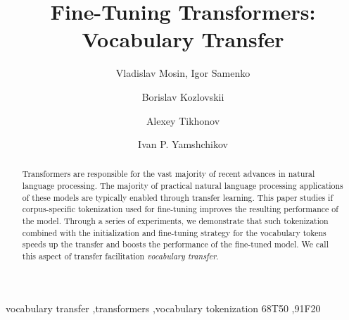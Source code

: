 \documentclass[review]{elsarticle}
\begin{document}
\begin{frontmatter}

\title{Fine-Tuning Transformers: Vocabulary Transfer}

\author{Vladislav Mosin, Igor Samenko}
\address{LEYA Lab, Yandex and Higher School of Economics,  3A Kantemirovskaya Street, St. Petersburg, Russia}

\author{Borislav Kozlovskii }
\address{Facebook UK, 1 Rathbone Square, Fitzrovia, London, UK, W1T 1HQ}

\author{Alexey Tikhonov }
\address{Independent researcher, Berlin, Germany}

\author{Ivan P. Yamshchikov }
\address{Max Planck Institute for Mathematics in the Sciences, Leipzig, Germany \\
CEMAPRE, University of Lisbon, Lisbon, Portugal}
 



\begin{abstract}
Transformers are responsible for the vast majority of recent advances in natural language processing. The majority of practical natural language processing applications of these models are typically enabled through transfer learning. This paper studies if corpus-specific tokenization used for fine-tuning improves the resulting performance of the model. Through a series of experiments, we demonstrate that such tokenization combined with the initialization and fine-tuning strategy for the vocabulary tokens speeds up the transfer and boosts the performance of the fine-tuned model. We call this aspect of transfer facilitation {\em vocabulary transfer}.
\end{abstract}

\begin{keyword}
vocabulary transfer \sep transformers \sep vocabulary tokenization
\MSC[2010] 68T50 \sep  91F20
\end{keyword}

\end{frontmatter}
\end{document}
